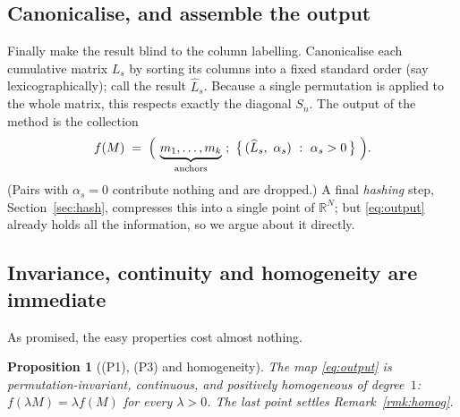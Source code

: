 \documentclass[11pt,a4paper]{article}
\theoremstyle{definition}
\theoremstyle{plain}
\newtheorem{proposition}[definition]{Proposition}
\newcommand{\R}{\mathbb{R}}
\newcommand{\Sn}{S_n}
\newcommand{\bary}{\widehat}      %
\begin{document}
\subsection{Canonicalise, and assemble the output}

Finally make the result blind to the column labelling. Canonicalise each
cumulative matrix $L_s$ by sorting its columns into a fixed standard order
(say lexicographically); call the result $\bary L_s$. Because a single
permutation is applied to the whole matrix, this respects exactly the diagonal
$\Sn$. The output of the method is the collection
\begin{equation}\label{eq:output}
   f(M)\;=\;\Bigl(\ \underbrace{m_1,\dots,m_k}_{\text{anchors}}\ ;\
       \bigl\{\,(\bary L_s,\ \alpha_s)\ :\ \alpha_s>0\,\bigr\}\ \Bigr).
\end{equation}
(Pairs with $\alpha_s=0$ contribute nothing and are dropped.) A final
\emph{hashing} step, Section~\ref{sec:hash}, compresses this into a single point
of $\R^N$; but \eqref{eq:output} already holds all the information, so we argue
about it directly.

\subsection{Invariance, continuity and homogeneity are immediate}

As promised, the easy properties cost almost nothing.

\begin{proposition}[(P1), (P3) and homogeneity]\label{prop:easy}
The map \eqref{eq:output} is permutation-invariant, continuous, and positively
homogeneous of degree~$1$: $f(\lambda M)=\lambda f(M)$ for every $\lambda>0$.
The last point settles Remark~\ref{rmk:homog}.
\end{proposition}
\end{document}
